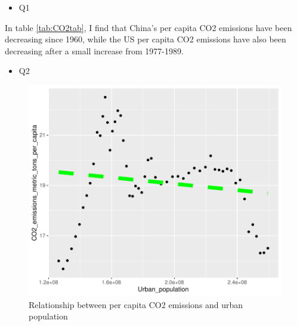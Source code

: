 \documentclass[11pt,a4paper,]{article}
\providecommand{\tightlist}{%
  \setlength{\itemsep}{0pt}\setlength{\parskip}{0pt}}
\begin{document}
\begin{itemize}
\tightlist
\item
  Q1
\end{itemize}

\begin{table}[!h]

\caption{\label{tab:CO2tab}CO2 emissions per capita in China and USA per 15 years from 1960 to 2014}
\centering
{}
\end{table}

In table \ref{tab:CO2tab}, I find that China's per capita CO2 emissions have been decreasing since 1960, while the US per capita CO2 emissions have also been decreasing after a small increase from 1977-1989.

\begin{itemize}
\tightlist
\item
  Q2
\end{itemize}

\begin{figure}[H]

{\centering \includegraphics{report_files/figure-latex/figure-1-1} 

}

\caption{Relationship between per capita CO2 emissions and urban population}\label{fig:figure-1}
\end{figure}
\end{document}

